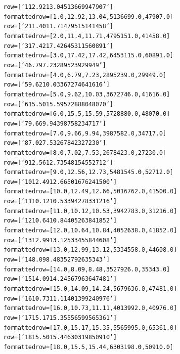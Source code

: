 \documentclass[letterpaper,10pt,english]{/usr/local/lib/python2.7/dist-packages/sphinx/texinputs/sphinxhowto}
\newenvironment{InvisibleVerbatim}
        {\begin{mdframed}[leftmargin=0.1\linewidth,innerleftmargin=3pt,innerrightmargin=3pt, userdefinedwidth=1\linewidth, linewidth=0pt, linecolor=white, usetwoside=false]}
        {\end{mdframed}}
\begin{document}
        

            
                \begin{InvisibleVerbatim}
                \vspace{-0.5\baselineskip}
\begin{alltt}row =  ['1         12.92           13.04            5136699   47907']
formatted row =  [1.0, 12.92, 13.04, 5136699.0, 47907.0]
row =  ['2         11.40           11.71            4795151   41458']
formatted row =  [2.0, 11.4, 11.71, 4795151.0, 41458.0]
row =  ['3         17.42           17.42            6453115   60891']
formatted row =  [3.0, 17.42, 17.42, 6453115.0, 60891.0]
row =  ['4          6.79            7.23            2895239   29949']
formatted row =  [4.0, 6.79, 7.23, 2895239.0, 29949.0]
row =  ['5          9.62           10.03            3672746   41616']
formatted row =  [5.0, 9.62, 10.03, 3672746.0, 41616.0]
row =  ['6         15.50           15.59            5728880   48070']
formatted row =  [6.0, 15.5, 15.59, 5728880.0, 48070.0]
row =  ['7          9.66            9.94            3987582   34717']
formatted row =  [7.0, 9.66, 9.94, 3987582.0, 34717.0]
row =  ['8          7.02            7.53            2678423   27230']
formatted row =  [8.0, 7.02, 7.53, 2678423.0, 27230.0]
row =  ['9         12.56           12.73            5481545   52712']
formatted row =  [9.0, 12.56, 12.73, 5481545.0, 52712.0]
row =  ['10        12.49           12.66            5016762   41500']
formatted row =  [10.0, 12.49, 12.66, 5016762.0, 41500.0]
row =  ['11        10.12           10.53            3942783   31216']
formatted row =  [11.0, 10.12, 10.53, 3942783.0, 31216.0]
row =  ['12        10.64           10.84            4052638   41852']
formatted row =  [12.0, 10.64, 10.84, 4052638.0, 41852.0]
row =  ['13        12.99           13.12            5334558   44608']
formatted row =  [13.0, 12.99, 13.12, 5334558.0, 44608.0]
row =  ['14         8.09            8.48            3527926   35343']
formatted row =  [14.0, 8.09, 8.48, 3527926.0, 35343.0]
row =  ['15        14.09           14.24            5679636   47481']
formatted row =  [15.0, 14.09, 14.24, 5679636.0, 47481.0]
row =  ['16        10.73           11.11            4013992   40976']
formatted row =  [16.0, 10.73, 11.11, 4013992.0, 40976.0]
row =  ['17        15.17           15.35            5565995   65361']
formatted row =  [17.0, 15.17, 15.35, 5565995.0, 65361.0]
row =  ['18        15.50           15.44            6303198   50910']
formatted row =  [18.0, 15.5, 15.44, 6303198.0, 50910.0]

\end{alltt}
\end{InvisibleVerbatim}
\end{document}
